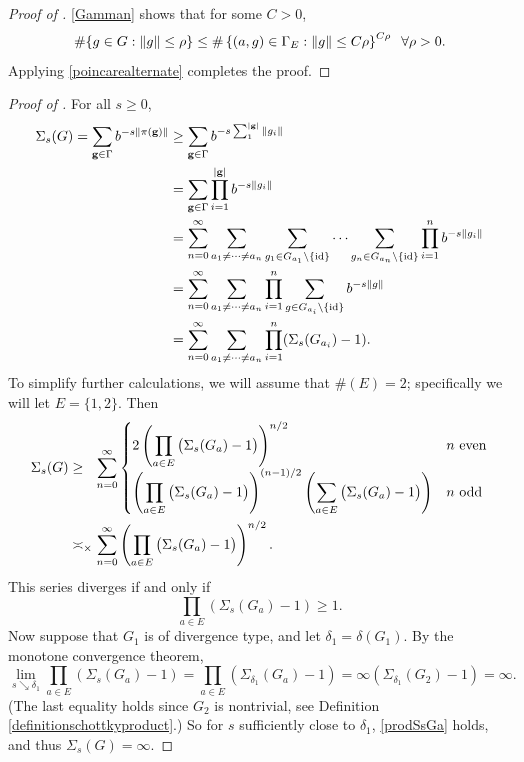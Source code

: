 \begin{proof}[Proof of ]
\eqref{Gamman} shows that for some $C > 0$,
\[
\#\{g\in G : \|g\| \leq \rho\} \leq \#\left\{(a,g)\in\Gamma_E : \|g\| \leq C\rho \right\}^{C\rho} \;\;\forall \rho > 0.
\]
Applying \eqref{poincarealternate} completes the proof.
\end{proof}
\begin{proof}[Proof of ]
For all $s\geq 0$,
\begin{align*}
\Sigma_s(G) = \sum_{\mathbf g\in\Gamma} b^{-s\|\pi(\mathbf g)\|}
&\geq \sum_{\mathbf g\in\Gamma} b^{-s\sum_1^{|\mathbf g|} \|g_i\|}\\
&= \sum_{\mathbf g\in\Gamma} \prod_{i = 1}^{|\mathbf g|} b^{-s\|g_i\|}\\
&= \sum_{n = 0}^\infty \sum_{a_1\neq \cdots \neq a_n} \sum_{g_1\in G_{a_1}\setminus\{\mathrm{id}\}}\cdots \sum_{g_n\in G_{a_n}\setminus\{\mathrm{id}\}}\prod_{i = 1}^n b^{-s\|g_i\|}\\
&= \sum_{n = 0}^\infty \sum_{a_1\neq \cdots \neq a_n} \prod_{i = 1}^n \sum_{g\in G_{a_i}\setminus\{\mathrm{id}\}} b^{-s\|g\|}\\
&= \sum_{n = 0}^\infty \sum_{a_1\neq \cdots \neq a_n} \prod_{i = 1}^n (\Sigma_s(G_{a_i}) - 1).
\end{align*}
To simplify further calculations, we will assume that $\#(E) = 2$; specifically we will let $E = \{1,2\}$. Then
\begin{align*}
\Sigma_s(G)
&\geq_\pt \sum_{n = 0}^\infty \begin{cases}
2\left(\displaystyle\prod_{a\in E}\big(\Sigma_s(G_a) - 1\big)\right)^{n/2} & n \text{ even}\\
\left(\displaystyle\prod_{a\in E}\big(\Sigma_s(G_a) - 1\big)\right)^{(n - 1)/2}\left(\displaystyle\sum_{a\in E}\big(\Sigma_s(G_a) - 1\big)\right) & n \text{ odd}
\end{cases}\\
&\asymp_\times \sum_{n = 0}^\infty \left(\prod_{a\in E}\big(\Sigma_s(G_a) - 1\big)\right)^{n/2}.
\end{align*}
This series diverges if and only if
\begin{equation}
\label{prodSsGa}
\prod_{a\in E}(\Sigma_s(G_a) - 1) \geq 1.
\end{equation}
Now suppose that $G_1$ is of divergence type, and let $\delta_1 = \delta(G_1)$. By the monotone convergence theorem,
\[
\lim_{s\searrow \delta_1} \prod_{a\in E}(\Sigma_s(G_a) - 1) = \prod_{a\in E}(\Sigma_{\delta_1}(G_a) - 1) = \infty(\Sigma_{\delta_1}(G_2) - 1) = \infty.
\]
(The last equality holds since $G_2$ is nontrivial, see Definition \ref{definitionschottkyproduct}.) So for $s$ sufficiently close to $\delta_1$, \eqref{prodSsGa} holds, and thus $\Sigma_s(G) = \infty$.
\end{proof}
